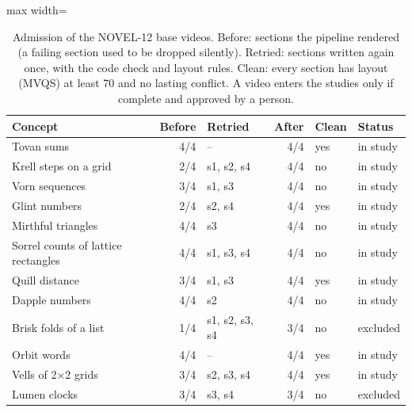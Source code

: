 \begin{table}[!tbp]\centering\small
\caption{Admission of the NOVEL-12 base videos. Before: sections the pipeline rendered (a failing section used to be dropped silently). Retried: sections written again once, with the code check and layout rules. Clean: every section has layout (MVQS) at least 70 and no lasting conflict. A video enters the studies only if complete and approved by a person.}\label{tab:quality}
\begin{adjustbox}{max width=\linewidth}\begin{tabular}{lrlrll}\toprule Concept & Before & Retried & After & Clean & Status\\\midrule
Tovan sums & 4/4 & -- & 4/4 & yes & in study \\
Krell steps on a grid & 2/4 & s1, s2, s4 & 4/4 & no & in study \\
Vorn sequences & 3/4 & s1, s3 & 4/4 & no & in study \\
Glint numbers & 2/4 & s2, s4 & 4/4 & yes & in study \\
Mirthful triangles & 4/4 & s3 & 4/4 & no & in study \\
Sorrel counts of lattice rectangles & 4/4 & s1, s3, s4 & 4/4 & no & in study \\
Quill distance & 3/4 & s1, s3 & 4/4 & yes & in study \\
Dapple numbers & 4/4 & s2 & 4/4 & no & in study \\
Brisk folds of a list & 1/4 & s1, s2, s3, s4 & 3/4 & no & excluded \\
Orbit words & 4/4 & -- & 4/4 & yes & in study \\
Vells of 2×2 grids & 3/4 & s2, s3, s4 & 4/4 & yes & in study \\
Lumen clocks & 3/4 & s3, s4 & 3/4 & no & excluded \\
\bottomrule\end{tabular}\end{adjustbox}
\end{table}
